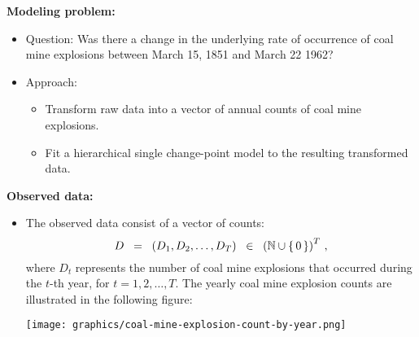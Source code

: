 \vskip 0.5cm
\noindent
\textbf{Modeling problem:}
\begin{itemize}
\item
	Question:
	\vskip 0.05cm
	Was there a change in the underlying rate of occurrence of coal mine explosions
	between March 15, 1851 and March 22 1962?

\item
	Approach:
	\vskip 0.05cm
	\begin{itemize}
	\item
		Transform raw data into a vector of annual counts of coal mine explosions.
	\item
		Fit a hierarchical single change-point model to the resulting transformed data.
	\end{itemize}

\end{itemize}


\vskip 0.5cm
\noindent
\textbf{Observed data:}
\begin{itemize}
\item
	The observed data consist of a vector of counts:
	\begin{equation*}
	D \;\; = \;\; (D_{1}, D_{2}, \ldots , D_{T}) \;\; \in \;\; \left(\mathbb{N}\cup\{\,0\,\}\right)^{T}\,,
	\end{equation*}
	where
	$D_{t}$ represents the number of coal mine explosions that occurred during the $t$-th year,
	for $t = 1, 2, \ldots, T$.
	The yearly coal mine explosion counts are illustrated in the following figure:
	\begin{center}
	\texttt{[image: graphics/coal-mine-explosion-count-by-year.png]}
	\end{center}
	
\end{itemize}


